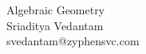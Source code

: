 \documentclass[../Main.tex]{subfiles}
\begin{document}
\begin{center}
		Algebraic Geometry \\
		Sriaditya Vedantam \\
		svedantam@zyphensvc.com
\end{center}
\end{document}
